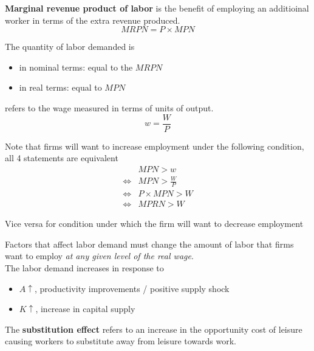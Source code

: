 \documentclass[letterpaper, 9pt,landscape]{extarticle}
\begin{document}
\begin{multicols*}{5}
\begin{definition}
    \textbf{Marginal revenue product of labor} is the benefit of employing an additioinal worker in terms of the extra revenue produced. 
    \[
        MRPN = P \times MPN
    \]
\end{definition}

The quantity of labor demanded is 
\begin{itemize}
    \item in nominal terms: equal to the $MRPN$
    \item in real terms: equal to $MPN$
\end{itemize} 

\begin{definition}
     refers to the wage measured in terms of units of output.
    \[
        w = \frac{W}{P}
    \]
\end{definition}

\begin{remark}
    Note that firms will want to increase employment under the following condition, all 4 statements are equivalent
    \begin{align*}
        & MPN > w  \\
        \iff & MPN > \frac{W}{P}  \\
        \iff & P \times MPN > W  \\
        \iff & MPRN > W 
    \end{align*}

    Vice versa for condition under which the firm will want to decrease employment
\end{remark}

\begin{remark}
Factors that affect labor demand must change the amount of labor that firms want to employ \textit{at any given level of the real wage}.\\

The labor demand increases in response to 
\begin{itemize}
    \item $A \uparrow$, productivity improvements / positive supply shock
    \item $K \uparrow$, increase in capital supply
\end{itemize} 
\end{remark}

\begin{definition}
    The \textbf{substitution effect} refers to an increase in the opportunity cost of leisure causing workers to substitute away from leisure towards work.
\end{definition}


\end{multicols*}
\end{document}

